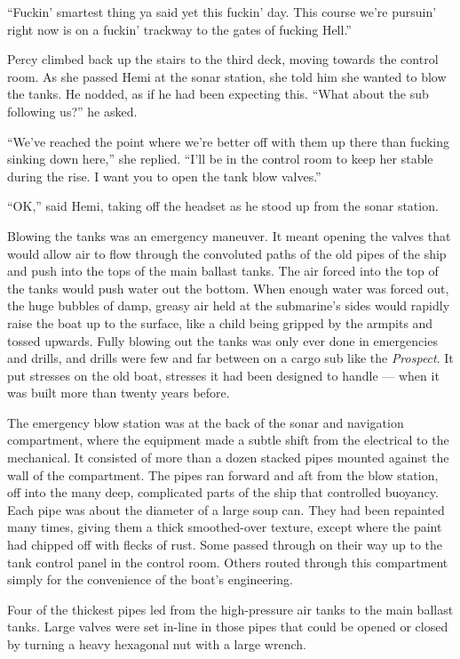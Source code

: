 \documentclass[
]{scrbook}
\begin{document}
``Fuckin' smartest thing ya said yet this fuckin' day. This course we're
pursuin' right now is on a fuckin' trackway to the gates of fucking
Hell.''

\bigskip

Percy climbed back up the stairs to the third deck, moving towards the
control room. As she passed Hemi at the sonar station, she told him she
wanted to blow the tanks. He nodded, as if he had been expecting this.
``What about the sub following us?'' he asked.

``We've reached the point where we're better off with them up there than
fucking sinking down here,'' she replied. ``I'll be in the control room
to keep her stable during the rise. I want you to open the tank blow
valves.''

``OK,'' said Hemi, taking off the headset as he stood up from the sonar
station.

Blowing the tanks was an emergency maneuver. It meant opening the valves
that would allow air to flow through the convoluted paths of the old
pipes of the ship and push into the tops of the main ballast tanks. The
air forced into the top of the tanks would push water out the bottom.
When enough water was forced out, the huge bubbles of damp, greasy air
held at the submarine's sides would rapidly raise the boat up to the
surface, like a child being gripped by the armpits and tossed upwards.
Fully blowing out the tanks was only ever done in emergencies and
drills, and drills were few and far between on a cargo sub like the
\emph{Prospect}. It put stresses on the old boat, stresses it had been
designed to handle --- when it was built more than twenty years before.

The emergency blow station was at the back of the sonar and navigation
compartment, where the equipment made a subtle shift from the electrical
to the mechanical. It consisted of more than a dozen stacked pipes
mounted against the wall of the compartment. The pipes ran forward and
aft from the blow station, off into the many deep, complicated parts of
the ship that controlled buoyancy. Each pipe was about the diameter of a
large soup can. They had been repainted many times, giving them a thick
smoothed-over texture, except where the paint had chipped off with
flecks of rust. Some passed through on their way up to the tank control
panel in the control room. Others routed through this compartment simply
for the convenience of the boat's engineering.

Four of the thickest pipes led from the high-pressure air tanks to the
main ballast tanks. Large valves were set in-line in those pipes that
could be opened or closed by turning a heavy hexagonal nut with a large
wrench.
\end{document}
